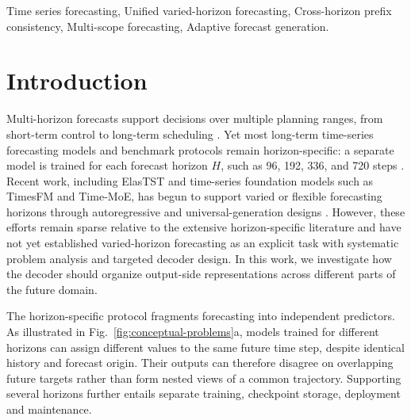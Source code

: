 \documentclass[final,3p,times]{elsarticle}
\begin{document}
\begin{frontmatter}
\begin{keyword}
Time series forecasting,
Unified varied-horizon forecasting,
Cross-horizon prefix consistency,
Multi-scope forecasting,
Adaptive forecast generation.
\end{keyword}

\end{frontmatter}




\section{Introduction}
\label{sec:introduction}


Multi-horizon forecasts support decisions over multiple planning ranges, from short-term control to long-term scheduling \citep{zeng2023dlinear}. Yet most long-term time-series forecasting models and benchmark protocols remain horizon-specific: a separate model is trained for each forecast horizon $H$, such as 96, 192, 336, and 720 steps \citep{nie2023patchtst,liu2024itransformer}. Recent work, including ElasTST\citep{zhang2024elastst} and time-series foundation models such as TimesFM\citep{das2024timesfm} and Time-MoE\citep{shi2025timemoe}, has begun to support varied or flexible forecasting horizons through autoregressive and universal-generation designs \citep{liu2024timer,ansari2024chronos,woo2024moirai}. However, these efforts remain sparse relative to the extensive horizon-specific literature and have not yet established varied-horizon forecasting as an explicit task with systematic problem analysis and targeted decoder design. In this work, we investigate how the decoder should organize output-side representations across different parts of the future domain.

The horizon-specific protocol fragments forecasting into independent predictors. As illustrated in Fig.~\ref{fig:conceptual-problems}a, models trained for different horizons can assign different values to the same future time step, despite identical history and forecast origin. Their outputs can therefore disagree on overlapping future targets rather than form nested views of a common trajectory. Supporting several horizons further entails separate training, checkpoint storage, deployment and maintenance.
\end{document}

